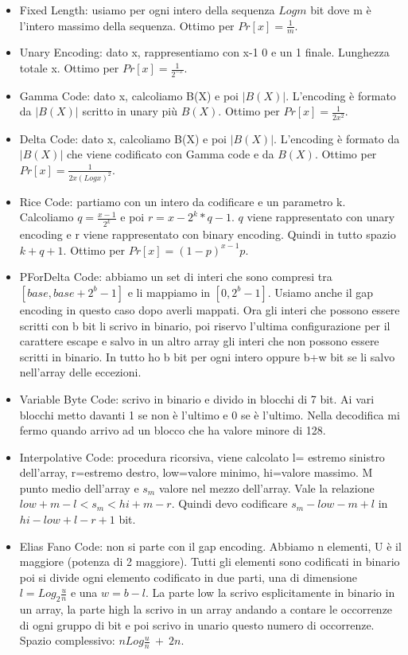 \documentclass[12pt]{article}
\begin{document}
\begin{itemize}
\item Fixed Length: usiamo per ogni intero della sequenza $Logm$ bit dove m è l'intero massimo della sequenza. Ottimo per $Pr[x]=\frac{1}{m}$.
\item Unary Encoding: dato x, rappresentiamo con x-1 0 e un 1 finale. Lunghezza totale x. Ottimo per $Pr[x]=\frac{1}{2^{-x}}$.
\item Gamma Code: dato x, calcoliamo B(X) e poi $|B(X)|$. L'encoding è formato da $|B(X)|$ scritto in unary più $B(X)$. Ottimo per $Pr[x]=\frac{1}{2x^2}$.
\item Delta Code: dato x, calcoliamo B(X) e poi $|B(X)|$. L'encoding è formato da $|B(X)|$ che viene codificato con Gamma code e da $B(X)$. Ottimo per $Pr[x]=\frac{1}{2x(Logx)^2}$.
\item Rice Code: partiamo con un intero da codificare e un parametro k. Calcoliamo $q=\frac{x-1}{2^k}$ e poi $r=x-2^k*q-1$. $q$ viene rappresentato con unary encoding e r viene rappresentato con binary encoding. Quindi in tutto spazio $k+q+1$. Ottimo per $Pr[x]=(1-p)^{x-1}p$.
\item PForDelta Code: abbiamo un set di interi che sono compresi tra $[base, base+2^b-1]$ e li mappiamo in $[0,2^b-1]$. Usiamo anche il gap encoding in questo caso dopo averli mappati.
Ora gli interi che possono essere scritti con b bit li scrivo in binario, poi riservo l'ultima configurazione per il carattere escape e salvo in un altro array gli interi che non possono essere scritti in binario. In tutto ho b bit per ogni intero oppure b+w bit se li salvo nell'array delle eccezioni. 
\item Variable Byte Code: scrivo in binario e divido in blocchi di 7 bit. Ai vari blocchi metto davanti 1 se non è l'ultimo e 0 se è l'ultimo.
Nella decodifica mi fermo quando arrivo ad un blocco che ha valore minore di 128.
\item Interpolative Code: procedura ricorsiva, viene calcolato l= estremo sinistro dell'array, r=estremo destro, low=valore minimo, hi=valore massimo. M punto medio dell'array e $s_m$ valore nel mezzo dell'array.
Vale la relazione $low+m-l<s_m<hi+m-r$.
Quindi devo codificare $s_m-low-m+l$ in $hi-low+l-r+1$ bit.
\item Elias Fano Code: non si parte con il gap encoding. Abbiamo n elementi, U è il maggiore (potenza di 2 maggiore). Tutti gli elementi sono codificati in binario poi si divide ogni elemento codificato in due parti, una di dimensione $l=Log_2 \frac{u}{n}$ e una $w=b-l$.
La parte low la scrivo esplicitamente in binario in un array, la parte high la scrivo in un array andando a contare le occorrenze di ogni gruppo di bit e poi scrivo in unario questo numero di occorrenze.
Spazio complessivo: $nLog\frac{u}{n}\ +\ 2n$.
\end{itemize}
\end{document}
